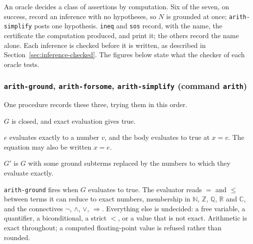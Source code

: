 An oracle decides a class of assertions by computation.  Six of the
seven, on success, record an inference with no hypotheses, so $N$ is
grounded at once; \texttt{arith-simplify} posts one hypothesis.
\texttt{ineq} and \texttt{sos} record, with the name, the certificate the
computation produced, and print it; the others record the name alone.
Each inference is checked before it is written, as described in
Section~\ref{sec:inference-checked}.  The figures below state what the
checker of each oracle tests.

\subsubsection*{\texttt{arith-ground}, \texttt{arith-forsome},
  \texttt{arith-simplify} (command \texttt{arith})}

One procedure records these three, trying them in this order.
\label{kop:arith-ground}%
\begin{VNBcond}
\item[Evaluation] $G$ is closed, and exact evaluation gives true.
\end{VNBcond}
\label{kop:arith-forsome}%
\begin{VNBcond}
\item[Evaluation] $e$ evaluates exactly to a number $v$, and the body
  evaluates to true at $x = v$.  The equation may also be written
  $x = e$.
\end{VNBcond}
\label{kop:arith-simplify}%
\begin{VNBcond}
\item[Evaluation] $G'$ is $G$ with some ground subterms replaced by
  the numbers to which they evaluate exactly.
\end{VNBcond}

\texttt{arith-ground} fires when $G$ evaluates to true.  The evaluator
reads $=$ and $\leq$ between terms it can reduce to exact numbers,
membership in $\mathbb{N}$, $\mathbb{Z}$, $\mathbb{Q}$, $\mathbb{R}$ and
$\mathbb{C}$, and the connectives $\neg$, $\wedge$, $\vee$,
$\Rightarrow$.  Everything else is undecided: a free variable, a
quantifier, a biconditional, a strict $<$, or a value that is not exact.
Arithmetic is exact throughout; a computed floating-point value is
refused rather than rounded.

